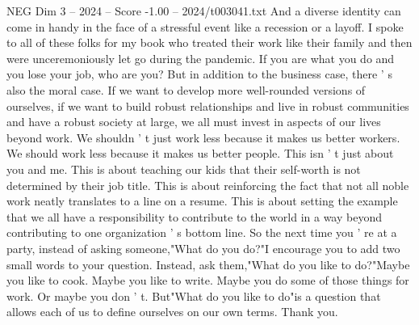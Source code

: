 \begin{textsample}{NEG Dim 3 – 2024 – Score -1.00 – 2024/t003041.txt}
And a diverse identity can come in handy in the face of a stressful event like a recession or a layoff.
I spoke to all of these folks for my book who treated their work like their family and then were unceremoniously let go during the pandemic.
If you are what you do and you lose your job, who are you?
But in addition to the business case, there ' s also the moral case.
If we want to develop more well-rounded versions of ourselves, if we want to build robust relationships and live in robust communities and have a robust society at large, we all must invest in aspects of our lives beyond work.
We shouldn ' t just work less because it makes us better workers.
We should work less because it makes us better people.
This isn ' t just about you and me.
This is about teaching our kids that their self-worth is not determined by their job title.
This is about reinforcing the fact that not all noble work neatly translates to a line on a resume.
This is about setting the example that we all have a responsibility to contribute to the world in a way beyond contributing to one organization ' s bottom line.
So the next time you ' re at a party, instead of asking someone,"What do you do?"I encourage you to add two small words to your question.
Instead, ask them,"What do you like to do?"Maybe you like to cook.
Maybe you like to write.
Maybe you do some of those things for work.
Or maybe you don ' t.
But"What do you like to do"is a question that allows each of us to define ourselves on our own terms.
Thank you.

\end{textsample}
